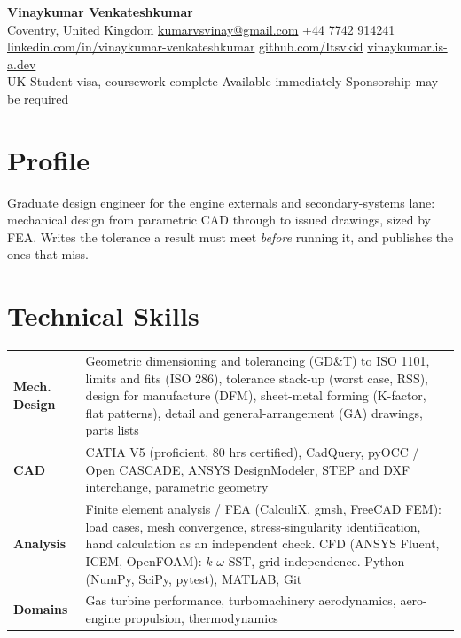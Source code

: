 \documentclass[10pt,a4paper]{article}
\newif\ifgraduatevisa
\newcommand{\sep}{\quad\textperiodcentered\quad}
\begin{document}
{\LARGE\bfseries Vinaykumar Venkateshkumar}\\[0.18em]
{\small Coventry, United Kingdom \sep
\href{mailto:kumarvsvinay@gmail.com}{kumarvsvinay@gmail.com} \sep
+44 7742 914241\\
\href{https://linkedin.com/in/vinaykumar-venkateshkumar}{linkedin.com/in/vinaykumar-venkateshkumar} \sep
\href{https://github.com/Itsvkid}{github.com/Itsvkid} \sep
\href{https://vinaykumar.is-a.dev}{vinaykumar.is-a.dev}\\
\ifgraduatevisa
  Right to work in the UK without sponsorship (Graduate visa) \sep Available immediately
\else
  UK Student visa, coursework complete \sep Available immediately \sep Sponsorship may be required
\fi}

\vspace{0.35em}

\section{Profile}
Graduate design engineer for the engine externals and secondary-systems lane: mechanical design from parametric CAD through to issued
drawings, sized by FEA. Writes the tolerance a result must meet \textit{before} running it, and publishes the ones that miss.

\section{Technical Skills}
{\small
\begin{tabular}{@{}L{2.6cm}L{15.1cm}@{}}
\textbf{Mech. Design} & Geometric dimensioning and tolerancing (GD\&T) to ISO 1101, limits and fits (ISO 286), tolerance stack-up (worst case, RSS), design for manufacture (DFM), sheet-metal forming (K-factor, flat patterns), detail and general-arrangement (GA) drawings, parts lists\\[0.10em]
\textbf{CAD} & CATIA V5 (proficient, 80 hrs certified), CadQuery, pyOCC / Open CASCADE, ANSYS DesignModeler, STEP and DXF interchange, parametric geometry\\[0.12em]
\textbf{Analysis} & Finite element analysis / FEA (CalculiX, gmsh, FreeCAD FEM): load cases, mesh convergence, stress-singularity identification, hand calculation as an independent check. CFD (ANSYS Fluent, ICEM, OpenFOAM): $k$-$\omega$ SST, grid independence. Python (NumPy, SciPy, pytest), MATLAB, Git\\[0.12em]
\textbf{Domains} & Gas turbine performance, turbomachinery aerodynamics, aero-engine propulsion, thermodynamics\\
\end{tabular}}
\end{document}
